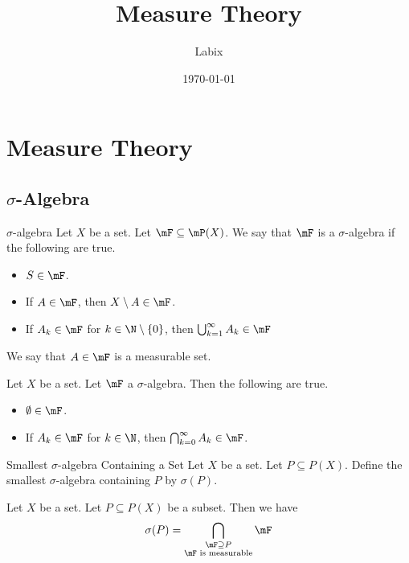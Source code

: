 \documentclass[a4paper]{article}
\title{Measure Theory}
\author{Labix}
\date{\today}
\begin{document}
\maketitle
\begin{abstract}
\end{abstract}
\pagebreak
\tableofcontents
\pagebreak

\section{Measure Theory}
\subsection{$\sigma$-Algebra}
\begin{defn}{$\sigma$-algebra}{} Let $X$ be a set. Let $\mF\subseteq\mP(X)$. We say that $\mF$ is a $\sigma$-algebra if the following are true. 
\begin{itemize}
\item $S\in\mF$. 
\item If $A\in\mF$, then $X\setminus A\in\mF$. 
\item If $A_k\in\mF$ for $k\in\N\setminus\{0\}$, then $\bigcup_{k=1}^\infty A_k\in\mF$
\end{itemize}
We say that $A\in\mF$ is a measurable set. 
\end{defn}

\begin{lmm}{}{} Let $X$ be a set. Let $\mF$ a $\sigma$-algebra. Then the following are true. 
\begin{itemize}
\item $\emptyset\in\mF$. 
\item If $A_k\in\mF$ for $k\in\N$, then $\bigcap_{k=0}^\infty A_k\in\mF$. 
\end{itemize}
\end{lmm}

\begin{defn}{Smallest $\sigma$-algebra Containing a Set}{} Let $X$ be a set. Let $P\subseteq P(X)$. Define the smallest $\sigma$-algebra containing $P$ by $\sigma(P)$. 
\end{defn}

\begin{lmm}{}{} Let $X$ be a set. Let $P\subseteq P(X)$ be a subset. Then we have $$\sigma(P)=\bigcap_{\substack{\mF\supseteq P\\\mF\text{ is measurable}}}\mF$$
\end{lmm}
\end{document}
